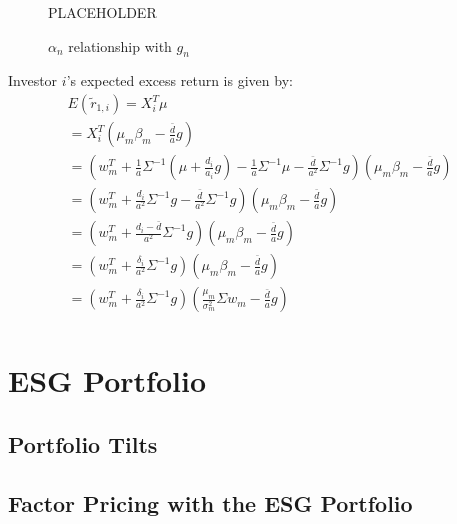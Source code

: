 \begin{figure}
    \centering
    PLACEHOLDER
    \caption{$\alpha_n$ relationship with $g_n$}
    \label{fig:esg_returns}
\end{figure}


Investor $i$'s expected excess return is given by:
\begin{equation}
    \begin{aligned}
E(\tilde{r}_{1,i}) = X_i^T \mu \\ 
= X_i^T (\mu_m \beta_m - \frac{\bar{d}}{a} g) \\
= (w_m^T + \frac{1}{a} \Sigma^{-1} (\mu + \frac{d_i}{a_i}g) - \frac{1}{a} \Sigma^{-1} \mu - \frac{\bar{d}}{a^2} \Sigma^{-1} g) (\mu_m \beta_m - \frac{\bar{d}}{a} g) \\
= (w_m^T + \frac{d_i}{a^2}\Sigma^{-1}g - \frac{\bar{d}}{a^2} \Sigma^{-1} g) (\mu_m \beta_m - \frac{\bar{d}}{a} g) \\
= (w_m^T + \frac{d_i - \bar{d}}{a^2} \Sigma^{-1} g) (\mu_m \beta_m - \frac{\bar{d}}{a} g) \\
= (w_m^T + \frac{\delta_i}{a^2} \Sigma^{-1} g) (\mu_m \beta_m - \frac{\bar{d}}{a} g) \\
= (w_m^T + \frac{\delta_i}{a^2} \Sigma^{-1} g) (\frac{\mu_m}{\sigma^2_m} \Sigma w_m - \frac{\bar{d}}{a}g) \\
    \end{aligned}
\end{equation}

\section{ESG Portfolio}

\subsection{Portfolio Tilts}


\subsection{Factor Pricing with the ESG Portfolio}